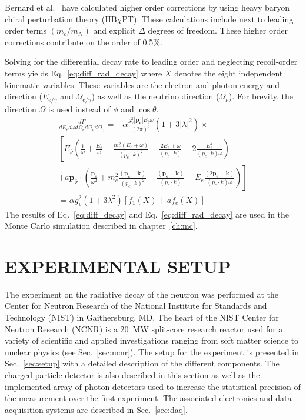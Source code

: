 \documentclass[oneside,12pt]{memoir}
\begin{document}
Bernard et al.~\cite{Bernard04,Bernard04er} have calculated higher order corrections by using heavy baryon chiral perturbation theory (HB$\chi$PT). These calculations include next to leading order terms $(m_e/m_N)$ and explicit $\Delta$ degrees of freedom. These higher order corrections contribute on the order of 0.5\%.\par
Solving for the differential decay rate to leading order and neglecting recoil-order terms yields Eq.~\ref{eq:diff_rad_decay} where $X$ denotes the eight independent kinematic variables. These variables are the electron and photon energy and direction ($E_{e/\gamma}$ and $\Omega_{e/\gamma}$) as well as the neutrino direction ($\Omega_\nu$). For brevity, the direction $\Omega$ is used instead of $\phi$ and $\cos\theta$.
\begin{align}
	\frac{d\Gamma}{dE_e d\omega d\Omega_e d\Omega_{\bar{\nu}}
		d\Omega_\gamma}=-\alpha\frac{g^2_V\left|\mathbf{p_e}\right|
		E_{\bar{\nu}}\omega}{\left(2\pi\right)^7}\left(1+
		3\left|\lambda\right|^2\right)\times \nonumber\\
		\left[E_{\bar{\nu}}\left(\frac{1}{\omega}+
		\frac{E_e}{\omega}+\frac{m^2_e\left(E_e+\omega\right)}
			{\left(p_e\cdot k\right)^2}
		-\frac{2E_e+\omega}{\left(p_e\cdot k\right)}-2\frac{E^2_e}
		{\left(p_e\cdot k\right)\omega}\right)\right. \nonumber\\
		\left.+a\mathbf{p_{\bar{\nu}}}\cdot\left(
		\frac{\mathbf{p_e}}{\omega^2}+
		m^2_e\frac{\left(\mathbf{p_e}+\mathbf{k}\right)}
			{\left(p_e\cdot k\right)^2}
		-\frac{\left(\mathbf{p_e}+\mathbf{k}\right)}
			{\left(p_e\cdot k\right)}
		-E_e\frac{\left(2\mathbf{p_e}+\mathbf{k}\right)}
			{\left(p_e\cdot k\right)\omega}\right)\right] \nonumber\\
		=\alpha g^2_v\left(1+3\lambda^2\right)
		\left[f_1\left(X\right)+af_e\left(X\right)\right]
	\label{eq:diff_rad_decay}
\end{align}
The results of Eq.~\ref{eq:diff_decay} and Eq.~\ref{eq:diff_rad_decay} are used in the Monte Carlo simulation described in chapter~\ref{ch:mc}.

\chapter{EXPERIMENTAL SETUP}
\label{ch:setup}
The experiment on the radiative decay of the neutron was performed at the Center for Neutron Research of the National Institute for Standards and Technology (NIST) in Gaithersburg, MD. The heart of the NIST Center for Neutron Research (NCNR) is a 20~MW split-core research reactor used for a variety of scientific and applied investigations ranging from soft matter science to nuclear physics (see Sec.~\ref{sec:ncnr}). The setup for the experiment is presented in Sec.~\ref{sec:setup} with a detailed description of the different components. The charged particle detector is also described in this section as well as the implemented array of photon detectors used to increase the statistical precision of the measurement over the first experiment. The associated electronics and data acquisition systems are described in Sec.~\ref{sec:daq}.
\end{document}
